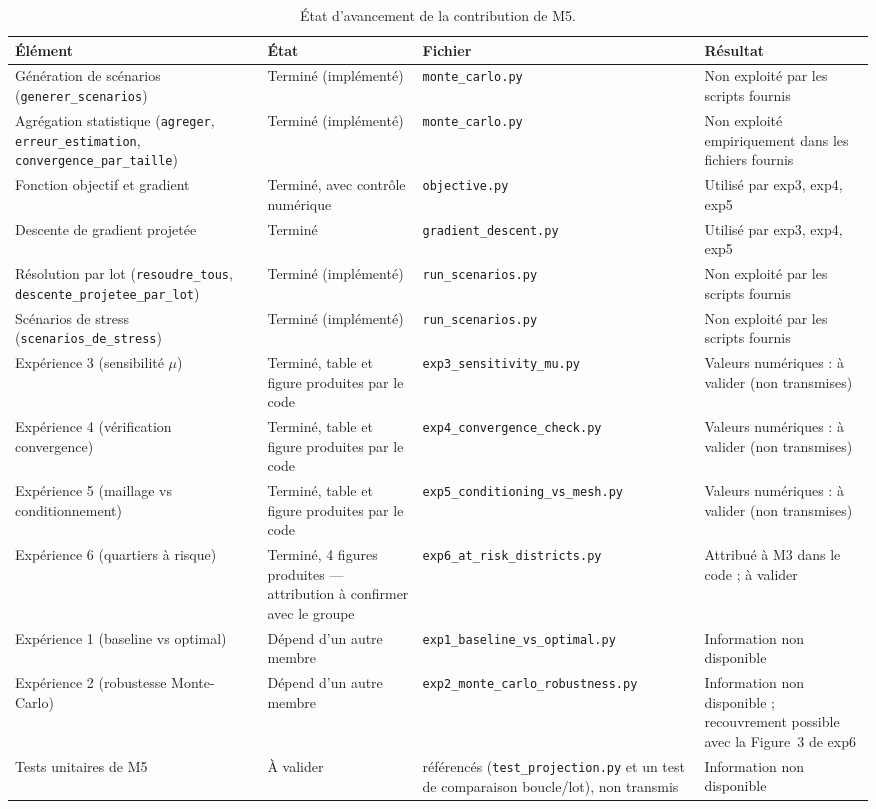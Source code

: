 \documentclass[11pt,a4paper]{article}
\begin{document}
\begin{longtable}{L{4.3cm}L{2.6cm}L{3.3cm}L{3.3cm}}
\caption{État d'avancement de la contribution de M5.}
\label{tab:avancement}\\
\toprule
Élément & État & Fichier & Résultat \\
\midrule
\endhead
Génération de scénarios (\texttt{generer\_scenarios}) & Terminé (implémenté) & \texttt{monte\_carlo.py} & Non exploité par les scripts fournis \\
Agrégation statistique (\texttt{agreger}, \texttt{erreur\_estimation}, \texttt{convergence\_par\_taille}) & Terminé (implémenté) & \texttt{monte\_carlo.py} & Non exploité empiriquement dans les fichiers fournis \\
Fonction objectif et gradient & Terminé, avec contrôle numérique & \texttt{objective.py} & Utilisé par exp3, exp4, exp5 \\
Descente de gradient projetée & Terminé & \texttt{gradient\_descent.py} & Utilisé par exp3, exp4, exp5 \\
Résolution par lot (\texttt{resoudre\_tous}, \texttt{descente\_projetee\_par\_lot}) & Terminé (implémenté) & \texttt{run\_scenarios.py} & Non exploité par les scripts fournis \\
Scénarios de stress (\texttt{scenarios\_de\_stress}) & Terminé (implémenté) & \texttt{run\_scenarios.py} & Non exploité par les scripts fournis \\
Expérience 3 (sensibilité $\mu$) & Terminé, table et figure produites par le code & \texttt{exp3\_sensitivity\_mu.py} & Valeurs numériques : à valider (non transmises) \\
Expérience 4 (vérification convergence) & Terminé, table et figure produites par le code & \texttt{exp4\_convergence\_check.py} & Valeurs numériques : à valider (non transmises) \\
Expérience 5 (maillage vs conditionnement) & Terminé, table et figure produites par le code & \texttt{exp5\_conditioning\_vs\_mesh.py} & Valeurs numériques : à valider (non transmises) \\
Expérience 6 (quartiers à risque) & Terminé, 4 figures produites --- attribution à confirmer avec le groupe & \texttt{exp6\_at\_risk\_districts.py} & Attribué à M3 dans le code ; à valider \\
Expérience 1 (baseline vs optimal) & Dépend d'un autre membre & \texttt{exp1\_baseline\_vs\_optimal.py} & Information non disponible \\
Expérience 2 (robustesse Monte-Carlo) & Dépend d'un autre membre & \texttt{exp2\_monte\_carlo\_robustness.py} & Information non disponible ; recouvrement possible avec la Figure~3 de exp6 \\
Tests unitaires de M5 & À valider & référencés (\texttt{test\_projection.py} et un test de comparaison boucle/lot), non transmis & Information non disponible \\
\bottomrule
\end{longtable}
\end{document}

